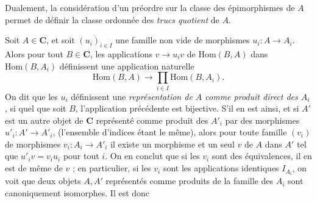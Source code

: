 Dualement, la considération d'un préordre sur la classe des épimorphismes de
$A$ permet de définir la classe ordonnée des \textit{trucs quotient} de $A$.

Soit $A\in\mathbf{C}$, et soit $(u_i)_{i\in I}$ une famille non vide de morphismes
$u_i:A\to A_i$. Alors pour tout $B\in\mathbf{C}$, les applications
$v\to u_iv$ de $\mathrm{Hom}(B,A)$ dans $\mathrm{Hom}(B,A_i)$
définissent une application naturelle
\[
  \mathrm{Hom}(B,A)\to
  \prod_{i\in I}\mathrm{Hom}(B,A_i).
\]
On dit que les $u_i$ définissent une \textit{représentation de $A$ comme
produit direct des $A_i$}, si quel que soit $B$, l'application précédente est
bijective. S'il en est ainsi, et si $A'$ est un autre objet de $\mathbf{C}$ représenté
comme produit des $A'_i$ par des morphismes
$u'_i:A'\to A'_i$, (l'ensemble d'indices étant le même), alors
pour toute famille $(v_i)$ de morphismes $v_i:A_i\to A'_i$ il
existe un morphisme et un seul $v$ de $A$ dans $A'$ tel que
$u'_iv=v_iu_i$ pour tout $i$. On en conclut que si les $v_i$ sont des
équivalences, il en est de même de $v$ ; en particulier, si les $v_i$ sont les
applications identiques $I_{A_i}$, on voit que deux objets $A,A'$ représentés
comme produits de la famille des $A_i$ sont canoniquement isomorphes. Il est
donc

